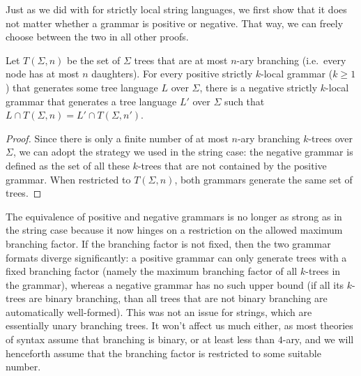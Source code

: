 Just as we did with for strictly local string languages, we first show that it does not matter whether a grammar is positive or negative.
That way, we can freely choose between the two in all other proofs.
%
\begin{lemma}
    Let $T(\Sigma,n)$ be the set of $\Sigma$ trees that are at most $n$-ary branching (i.e.\ every node has at most $n$ daughters).
    For every positive strictly $k$-local grammar ($k \geq 1$) that generates some tree language $L$ over $\Sigma$, there is a negative strictly $k$-local grammar that generates a tree language $L'$ over $\Sigma$ such that $L \cap T(\Sigma,n) = L' \cap T(\Sigma,n')$.
\end{lemma}
%
\begin{proof}
    Since there is only a finite number of at most $n$-ary branching $k$-trees over $\Sigma$, we can adopt the strategy we used in the string case: the negative grammar is defined as the set of all these $k$-trees that are not contained by the positive grammar.
    When restricted to $T(\Sigma,n)$, both grammars generate the same set of trees.
\end{proof}
%
The equivalence of positive and negative grammars is no longer as strong as in the string case because it now hinges on a restriction on the allowed maximum branching factor.
If the branching factor is not fixed, then the two grammar formats diverge significantly: a positive grammar can only generate trees with a fixed branching factor (namely the maximum branching factor of all $k$-trees in the grammar), whereas a negative grammar has no such upper bound (if all its $k$-trees are binary branching, than all trees that are not binary branching are automatically well-formed).
This was not an issue for strings, which are essentially unary branching trees.
%
It won't affect us much either, as most theories of syntax assume that branching is binary, or at least less than $4$-ary, and we will henceforth assume that the branching factor is restricted to some suitable number.

